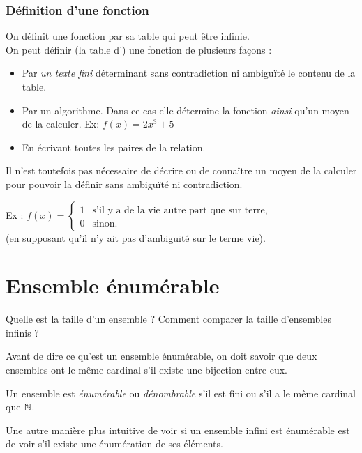 \subsubsection{Définition d'une fonction}
\label{par:d_finition_d_une_fonciton}
On définit une fonction par sa table qui peut être infinie.\\
On peut définir (la table d') une fonction de plusieurs façons :
\begin{itemize}
	\item Par \emph{un texte fini} déterminant sans contradiction ni ambiguïté le contenu
		de la table.
	\item Par un algorithme. Dans ce cas elle détermine la fonction \textit{ainsi} qu'un moyen de la calculer.
		\subitem Ex: $f(x) = 2x^3+5$
	\item En écrivant toutes les paires de la relation.
\end{itemize}
Il n'est toutefois pas nécessaire de décrire ou de connaître un moyen de la calculer
pour pouvoir la définir sans ambiguïté ni contradiction.

Ex : $f(x) = \left\{\begin{array}{ll} 1 & \text{s'il y a de la vie autre part que sur terre,} \\ 0 & \text{sinon.}\end{array}\right.$\\(en supposant qu'il n'y ait pas d'ambiguïté sur le terme \og vie\fg).\\

\section{Ensemble énumérable}
\label{sec:ensemble_num_rables}
Quelle est la taille d'un ensemble ?  Comment comparer la taille d'ensembles infinis ?

Avant de dire ce qu'est un ensemble énumérable, on doit savoir que deux ensembles
ont le même cardinal s'il existe une bijection entre eux.

\begin{mydef}
	Un ensemble est \emph{énumérable} ou \emph{dénombrable} s'il est fini ou s'il a le même cardinal que $\mathbb{N}$.
\end{mydef}
Une autre manière plus intuitive de voir si un ensemble infini est énumérable est de voir s'il existe une énumération de ses éléments.

